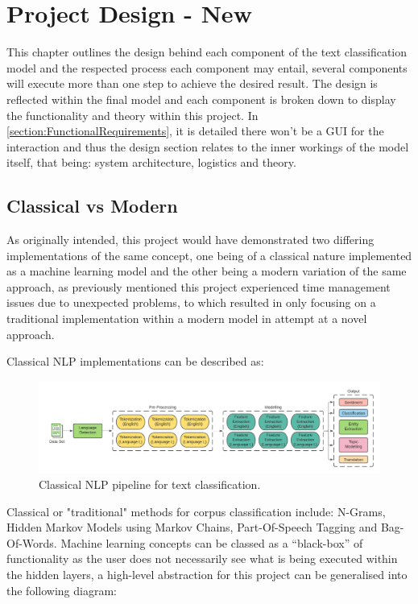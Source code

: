 \chapter{Project Design - New}

This chapter outlines the design behind each component of the text classification model and the respected process each component may entail, several components will execute more than one step to achieve the desired result. The design is reflected within the final model and each component is broken down to display the functionality and theory within this project. In \autoref{section:FunctionalRequirements}, it is detailed there won’t be a GUI for the interaction and thus the design section relates to the inner workings of the model itself, that being: system architecture, logistics and theory.

\section{Classical vs Modern}

As originally intended, this project would have demonstrated two differing implementations of the same concept, one being of a classical nature implemented as a machine learning model and the other being a modern variation of the same approach, as previously mentioned this project experienced time management issues due to unexpected problems, to which resulted in only focusing on a traditional implementation within a modern model in attempt at a novel approach. \newpage

Classical NLP implementations can be described as:

\begin{figure}[H]
    \centering
    \includegraphics[width=\textwidth]{figures/chapter-5/ClassicalNLP.pdf}
    \caption[ClassicalNLP]{Classical NLP pipeline for text classification.
    \label{fig:ClassicalNLP}}
\end{figure}

Classical or "traditional" methods for corpus classification include: N-Grams, Hidden Markov Models using Markov Chains, Part-Of-Speech Tagging and Bag-Of-Words. Machine learning concepts can be classed as a “black-box” of functionality as the user does not necessarily see what is being executed within the hidden layers, a high-level abstraction for this project can be generalised into the following diagram:

